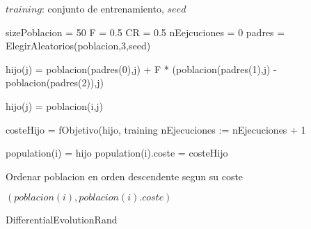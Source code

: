\documentclass{article}
\begin{document}
\begin{algorithm}
\begin{algorithmic}[1]
	\REQUIRE $training$: conjunto de entrenamiento, $seed$

	\STATE sizePoblacion = 50
	\STATE F = 0.5	
	\STATE CR = 0.5
	\STATE nEejcuciones = 0
	\REPEAT
			\STATE padres = ElegirAleatorios(poblacion,3,seed)

					\STATE hijo(j) = poblacion(padres(0),j) + F * (poblacion(padres(1),j) - poblacion(padres(2)),j)
				
				\ELSE
					\STATE hijo(j) = poblacion(i,j)	
				\ENDIF
			\ENDFOR

			\STATE costeHijo = fObjetivo(hijo, training
			\STATE nEjecuciones := nEjecuciones + 1

				\STATE population(i) = hijo
				\STATE population(i).coste = costeHijo
			\ENDIF
		\ENDFOR
			

 	\STATE Ordenar poblacion en orden descendente segun su coste
	
	\RETURN $(poblacion(i), poblacion(i).coste)$
\end{algorithmic}
\caption{DifferentialEvolutionRand}
\end{algorithm}
\end{document}
